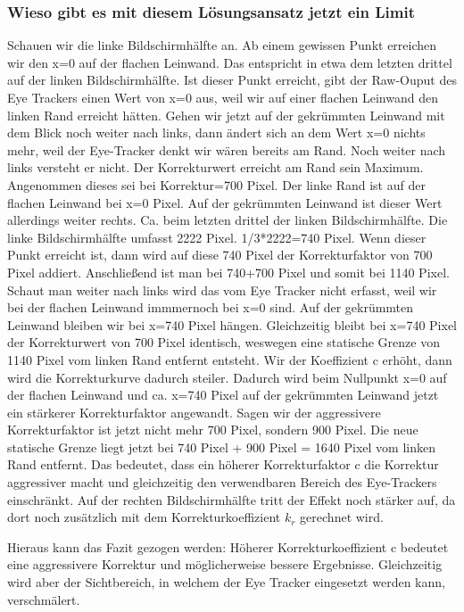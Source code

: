 \subsubsection{Wieso gibt es mit diesem Lösungsansatz jetzt ein Limit}

Schauen wir die linke Bildschirmhälfte an. Ab einem gewissen Punkt erreichen wir den x=0 auf der flachen Leinwand. Das entspricht in etwa dem letzten drittel auf der linken Bildschirmhälfte. Ist dieser Punkt erreicht, gibt der Raw-Ouput des Eye Trackers einen Wert von x=0 aus, weil wir auf einer flachen Leinwand den linken Rand erreicht hätten. Gehen wir jetzt auf der gekrümmten Leinwand mit dem Blick noch weiter nach links, dann ändert sich an dem Wert x=0 nichts mehr, weil der Eye-Tracker denkt wir wären bereits am Rand. Noch weiter nach links versteht er nicht. Der Korrekturwert erreicht am Rand sein Maximum. Angenommen dieses sei bei Korrektur=700 Pixel. Der linke Rand ist auf der flachen Leinwand bei x=0 Pixel. Auf der gekrümmten Leinwand ist dieser Wert allerdings weiter rechts. Ca. beim letzten drittel der linken Bildschirmhälfte. Die linke Bildschirmhälfte umfasst 2222 Pixel. 1/3*2222=740 Pixel. Wenn dieser Punkt erreicht ist, dann wird auf diese 740 Pixel der Korrekturfaktor von 700 Pixel addiert. Anschließend ist man bei 740+700 Pixel und somit bei 1140 Pixel. Schaut man weiter nach links wird das vom Eye Tracker nicht erfasst, weil wir bei der flachen Leinwand immmernoch bei x=0 sind. Auf der gekrümmten Leinwand bleiben wir bei x=740 Pixel hängen. Gleichzeitig bleibt bei x=740 Pixel der Korrekturwert von 700 Pixel identisch, weswegen eine statische Grenze von 1140 Pixel vom linken Rand entfernt entsteht. Wir der Koeffizient c erhöht, dann wird die Korrekturkurve dadurch steiler. Dadurch wird beim Nullpunkt x=0 auf der flachen Leinwand und ca. x=740 Pixel auf der gekrümmten Leinwand jetzt ein stärkerer Korrekturfaktor angewandt. Sagen wir der aggressivere Korrekturfaktor ist jetzt nicht mehr 700 Pixel, sondern 900 Pixel. Die neue statische Grenze liegt jetzt bei 740 Pixel + 900 Pixel = 1640 Pixel vom linken Rand entfernt. Das bedeutet, dass ein höherer Korrekturfaktor c die Korrektur aggressiver macht und gleichzeitig den verwendbaren Bereich des Eye-Trackers einschränkt. Auf der rechten Bildschirmhälfte tritt der Effekt noch stärker auf, da dort noch zusätzlich mit dem Korrekturkoeffizient $k_r$ gerechnet wird. 


Hieraus kann das Fazit gezogen werden: Höherer Korrekturkoeffizient c bedeutet eine aggressivere Korrektur und möglicherweise bessere Ergebnisse. Gleichzeitig wird aber der Sichtbereich, in welchem der Eye Tracker eingesetzt werden kann, verschmälert. 



